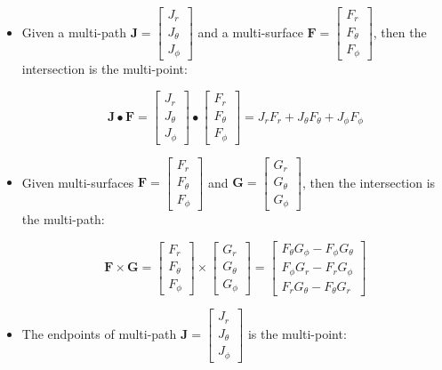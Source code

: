 \documentclass{book}
\begin{document}
\begin{itemize}
\item Given a multi-path \(\mathbf{J} = \begin{bmatrix} J_r \\ J_\theta \\ J_\phi \end{bmatrix}\) and a multi-surface \(\mathbf{F} = \begin{bmatrix} F_r \\ F_\theta \\ F_\phi \end{bmatrix}\), then the intersection is the multi-point:

\[\mathbf{J} \bullet \mathbf{F} = \begin{bmatrix} J_r \\ J_\theta \\ J_\phi \end{bmatrix} \bullet \begin{bmatrix} F_r \\ F_\theta \\ F_\phi \end{bmatrix} = J_r F_r + J_\theta F_\theta + J_\phi F_\phi\]
\item Given multi-surfaces \(\mathbf{F} = \begin{bmatrix} F_r \\ F_\theta \\ F_\phi \end{bmatrix}\) and \(\mathbf{G} = \begin{bmatrix} G_r \\ G_\theta \\ G_\phi \end{bmatrix}\), then the intersection is the multi-path:

\[\mathbf{F} \times \mathbf{G} = \begin{bmatrix} F_r \\ F_\theta \\ F_\phi \end{bmatrix} \times \begin{bmatrix} G_r \\ G_\theta \\ G_\phi \end{bmatrix}
 = \begin{bmatrix} F_\theta G_\phi - F_\phi G_\theta \\ F_\phi G_r - F_r G_\phi \\ F_r G_\theta - F_\theta G_r \end{bmatrix}\]
\item The endpoints of multi-path \(\mathbf{J} = \begin{bmatrix} J_r \\ J_\theta \\ J_\phi \end{bmatrix}\) is the multi-point:


\end{itemize}
\end{document}
